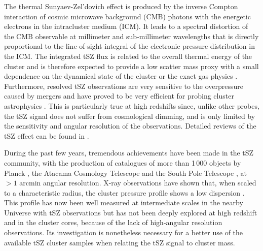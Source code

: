 \documentclass[twocolumn,traditabstract]{aa}
\begin{document}
The thermal Sunyaev-Zel'dovich effect \citep[tSZ,][]{sunyaev1972,sunyaev1980} is produced by the inverse Compton interaction of cosmic microwave background (CMB) photons with the energetic electrons in the intracluster medium (ICM). It leads to a spectral distortion of the CMB observable at millimeter and sub-millimeter wavelengths that is directly proportional to the line-of-sight integral of the electronic pressure distribution in the ICM. The integrated tSZ flux is related to the overall thermal energy of the cluster and is therefore expected to provide a low scatter mass proxy with a small dependence on the dynamical state of the cluster or the exact gas physics \citep[e.g.][]{dasilva2004,motl2005,nagai2006}. Furthermore, resolved tSZ observations are very sensitive to the overpressure caused by mergers and have proved to be very efficient for probing cluster astrophysics \citep[see for example results by][]{pointecouteau1999,komatsu2001,korngut2011,adam2013,young2014,adam2014,mroczkowski2015}. This is particularly true at high redshifts since, unlike other probes, the tSZ signal does not suffer from cosmological dimming, and is only limited by the sensitivity and angular resolution of the observations. Detailed reviews of the tSZ effect can be found in \cite{birkinshaw1999,carlstrom2002,kitayama2014}.

During the past few years, tremendous achievements have been made in the tSZ community, with the production of catalogues of more than 1\,000 objects by Planck \citep{planck2013catalogue}, the Atacama Cosmology Telescope \citep[ACT,][]{hasselfield2013} and the South Pole Telescope \citep[SPT,][]{reichardt2013,bleem2014}, at $>1$ arcmin angular resolution. X-ray observations have shown that, when  scaled to a characteristic radius, the cluster pressure profile shows a low dispersion \citep{arnaud2010}. This profile has now been well measured at intermediate scales in the nearby Universe with tSZ observations \citep{plagge2010,planck2013pressure_profile,sayers2013b} but has not been deeply explored at high redshift and in the cluster cores, because of the lack of high-angular resolution observations. Its investigation is nonetheless necessary for a better use of the available tSZ cluster samples when relating the tSZ signal to cluster mass.
\end{document}
